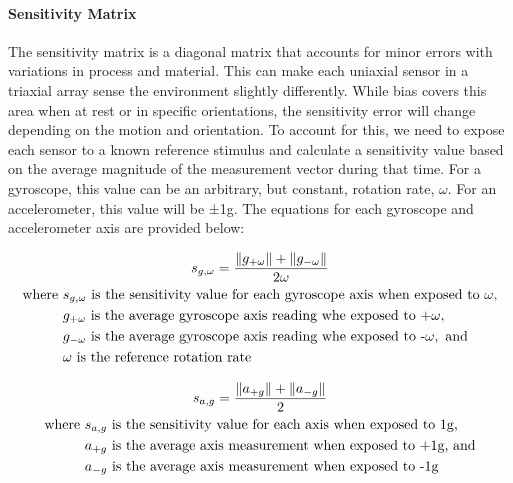 \paragraph*{Sensitivity Matrix} The sensitivity matrix is a diagonal matrix that accounts for minor errors with variations in process and material. 
This can make each uniaxial sensor in a triaxial array sense the environment slightly differently. 
While bias covers this area when at rest or in specific orientations, the sensitivity error will change depending on the motion and orientation. 
To account for this, we need to expose each sensor to a known reference stimulus and calculate a sensitivity value based on the average magnitude of the measurement vector during that time. 
For a gyroscope, this value can be an arbitrary, but constant, rotation rate, $\omega$. 
For an accelerometer, this value will be ±1g. The equations for each gyroscope and accelerometer axis are provided below:

\begin{gather}
    s_{g, \omega} = \frac{\lVert g_{+\omega}\rVert + \lVert g_{-\omega}\rVert}{2\omega} \\
    \begin{aligned}
        \text{where } & s_{g,\omega} \text{ is the sensitivity value for each gyroscope axis when exposed to } \omega , \\
        & g_{+\omega } \text{ is the average gyroscope axis reading whe exposed to +} \omega ,\\
        & g_{-\omega } \text{ is the average gyroscope axis reading whe exposed to -} \omega , \text{ and} \\
        & \omega \text{ is the reference rotation rate}
    \end{aligned} \notag
\end{gather}

\begin{gather}
    s_{a, g} = \frac{\lVert a_{+g} \rVert + \lVert a_{-g} \rVert}{2} \\
    \begin{aligned}
        \text{where } & s_{a,g} \text{ is the sensitivity value for each axis when exposed to 1g,} \\
        & a_{+g} \text{ is the average axis measurement when exposed to +1g, and} \\
        & a_{-g} \text{ is the average axis measurement when exposed to -1g}
    \end{aligned} \notag
\end{gather}

